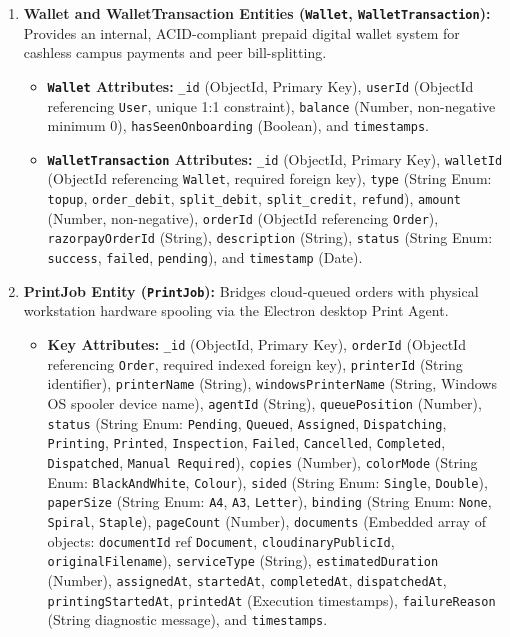 \documentclass[12pt,a4paper]{report}
\begin{document}
\begin{enumerate}[leftmargin=0.35in, itemsep=4pt]
  \item \textbf{Wallet and WalletTransaction Entities (\texttt{Wallet}, \texttt{WalletTransaction}):}
  Provides an internal, ACID-compliant prepaid digital wallet system for cashless campus payments and peer bill-splitting.
  \begin{itemize}[leftmargin=0.25in, itemsep=2pt]
    \item \textbf{\texttt{Wallet} Attributes:} \texttt{\_id} (ObjectId, Primary Key), \texttt{userId} (ObjectId referencing \texttt{User}, unique 1:1 constraint), \texttt{balance} (Number, non-negative minimum 0), \texttt{hasSeenOnboarding} (Boolean), and \texttt{timestamps}.
    \item \textbf{\texttt{WalletTransaction} Attributes:} \texttt{\_id} (ObjectId, Primary Key), \texttt{walletId} (ObjectId referencing \texttt{Wallet}, required foreign key), \texttt{type} (String Enum: \texttt{topup}, \texttt{order\_debit}, \texttt{split\_debit}, \texttt{split\_credit}, \texttt{refund}), \texttt{amount} (Number, non-negative), \texttt{orderId} (ObjectId referencing \texttt{Order}), \texttt{razorpayOrderId} (String), \texttt{description} (String), \texttt{status} (String Enum: \texttt{success}, \texttt{failed}, \texttt{pending}), and \texttt{timestamp} (Date).
  \end{itemize}

  \item \textbf{PrintJob Entity (\texttt{PrintJob}):}
  Bridges cloud-queued orders with physical workstation hardware spooling via the Electron desktop Print Agent.
  \begin{itemize}[leftmargin=0.25in, itemsep=2pt]
    \item \textbf{Key Attributes:} \texttt{\_id} (ObjectId, Primary Key), \texttt{orderId} (ObjectId referencing \texttt{Order}, required indexed foreign key), \texttt{printerId} (String identifier), \texttt{printerName} (String), \texttt{windowsPrinterName} (String, Windows OS spooler device name), \texttt{agentId} (String), \texttt{queuePosition} (Number), \texttt{status} (String Enum: \texttt{Pending}, \texttt{Queued}, \texttt{Assigned}, \texttt{Dispatching}, \texttt{Printing}, \texttt{Printed}, \texttt{Inspection}, \texttt{Failed}, \texttt{Cancelled}, \texttt{Completed}, \texttt{Dispatched}, \texttt{Manual Required}), \texttt{copies} (Number), \texttt{colorMode} (String Enum: \texttt{BlackAndWhite}, \texttt{Colour}), \texttt{sided} (String Enum: \texttt{Single}, \texttt{Double}), \texttt{paperSize} (String Enum: \texttt{A4}, \texttt{A3}, \texttt{Letter}), \texttt{binding} (String Enum: \texttt{None}, \texttt{Spiral}, \texttt{Staple}), \texttt{pageCount} (Number), \texttt{documents} (Embedded array of objects: \texttt{documentId} ref \texttt{Document}, \texttt{cloudinaryPublicId}, \texttt{originalFilename}), \texttt{serviceType} (String), \texttt{estimatedDuration} (Number), \texttt{assignedAt}, \texttt{startedAt}, \texttt{completedAt}, \texttt{dispatchedAt}, \texttt{printingStartedAt}, \texttt{printedAt} (Execution timestamps), \texttt{failureReason} (String diagnostic message), and \texttt{timestamps}.
  \end{itemize}


\end{enumerate}
\end{document}
